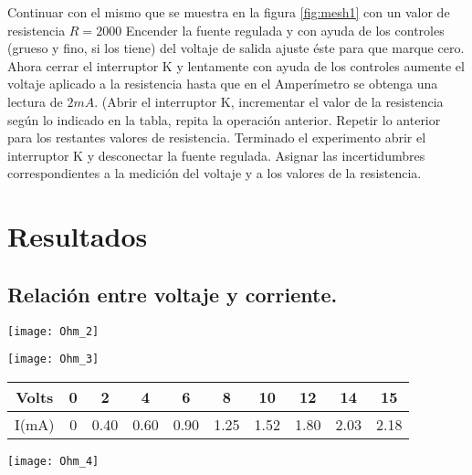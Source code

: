 \documentclass[11pt]{article}
\newenvironment{Figuras}
  {\par\medskip\noindent\minipage{\linewidth}}
  {\endminipage\par\medskip}
\begin{document}
\begin{multicols}{2}
	Continuar con el mismo que se muestra en la figura \ref{fig:mesh1} con un valor de resistencia $R = 2000$
	Encender la fuente regulada y con ayuda de los controles (grueso y fino, si los tiene) del voltaje de salida ajuste éste para que marque cero.
	Ahora cerrar el interruptor K y lentamente con ayuda de los controles aumente el voltaje aplicado a la resistencia hasta que en el Amperímetro se obtenga una lectura de $2 mA$.
	(Abrir el interruptor K, incrementar el valor de la resistencia según lo indicado en la tabla, repita la operación anterior. Repetir lo anterior para los restantes valores de resistencia.
	Terminado el experimento abrir el interruptor K y desconectar la fuente regulada.
	Asignar las incertidumbres correspondientes a la medición del voltaje y a los valores de la resistencia.



\section{Resultados}
	
	\subsection{Relación entre voltaje y corriente.}

		\begin{Figuras}
			\centering
		    \texttt{[image: Ohm\_2]}
		    \label{fig:mesh2}
		\end{Figuras}

		\begin{Figuras}
			\centering
		    \texttt{[image: Ohm\_3]}
		    \label{fig:mesh3}
		\end{Figuras}

		  \begin{tabular}{@{}cccccccccc@{}}
		    \toprule

				Volts&	0&		2&		4&		6&		8&	10&		12&		14&		15\\
				\midrule
				I(mA)&	0&	0.40&	0.60&	0.90&	1.25&	1.52&	1.80&	2.03&	2.18\\
		    \bottomrule
		  \end{tabular}

\pagebreak

		\begin{Figuras}
			\centering
		    \texttt{[image: Ohm\_4]}
		    \label{fig:mesh4}
		\end{Figuras}
 

\end{multicols}
\end{document}

